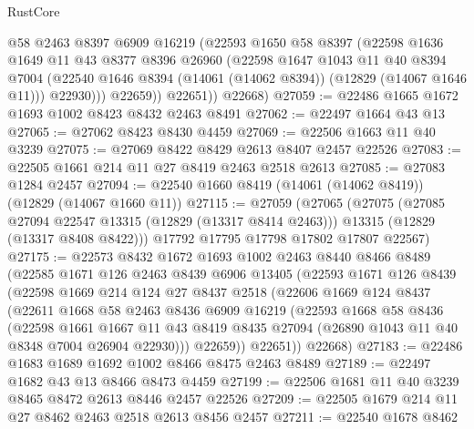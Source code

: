 \begin{lexlean}{RustCore}
\begin{coremodule}
              @58
              @2463
              @8397
              @6909
              @16219
              (@22593
                @1650
                @58
                @8397
                (@22598
                  @1636
                  @1649
                  @11
                  @43
                  @8377
                  @8396
                  @26960
                  (@22598
                    @1647
                    @1043
                    @11
                    @40
                    @8394
                    @7004
                    (@22540 @1646 @8394 (@14061 (@14062 @8394)) (@12829 (@14067 @1646 @11)))
                    @22930)))
              @22659))
          @22651))
      @22668)
@27059 := @22486 @1665 @1672 @1693 @1002 @8423 @8432 @2463 @8491
@27062 := @22497 @1664 @43 @13
@27065 := @27062 @8423 @8430 @4459
@27069 := @22506 @1663 @11 @40 @3239
@27075 := @27069 @8422 @8429 @2613 @8407 @2457 @22526
@27083 := @22505 @1661 @214 @11 @27 @8419 @2463 @2518 @2613
@27085 := @27083 @1284 @2457
@27094 := @22540 @1660 @8419 (@14061 (@14062 @8419)) (@12829 (@14067 @1660 @11))
@27115 := @27059
    (@27065
      (@27075
        (@27085 @27094 @22547 @13315 (@12829 (@13317 @8414 @2463)))
        @13315
        (@12829 (@13317 @8408 @8422)))
      @17792
      @17795
      @17798
      @17802
      @17807
      @22567)
@27175 := @22573
    @8432
    @1672
    @1693
    @1002
    @2463
    @8440
    @8466
    @8489
    (@22585
      @1671
      @126
      @2463
      @8439
      @6906
      @13405
      (@22593
        @1671
        @126
        @8439
        (@22598
          @1669
          @214
          @124
          @27
          @8437
          @2518
          (@22606
            @1669
            @124
            @8437
            (@22611
              @1668
              @58
              @2463
              @8436
              @6909
              @16219
              (@22593
                @1668
                @58
                @8436
                (@22598
                  @1661
                  @1667
                  @11
                  @43
                  @8419
                  @8435
                  @27094
                  (@26890 @1043 @11 @40 @8348 @7004 @26904 @22930)))
              @22659))
          @22651))
      @22668)
@27183 := @22486 @1683 @1689 @1692 @1002 @8466 @8475 @2463 @8489
@27189 := @22497 @1682 @43 @13 @8466 @8473 @4459
@27199 := @22506 @1681 @11 @40 @3239 @8465 @8472 @2613 @8446 @2457 @22526
@27209 := @22505 @1679 @214 @11 @27 @8462 @2463 @2518 @2613 @8456 @2457
@27211 := @22540 @1678 @8462

\end{coremodule}
\end{lexlean}
